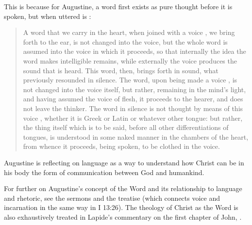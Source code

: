 This is because for Augustine, a word first exists as pure thought before it is
spoken, but when uttered is :
\begin{quote}
    A word  that we carry in the heart, when
    joined with a voice , we bring
    forth to the ear, is not changed into the voice, but the whole word is
    assumed into the voice in which it proceeds, so that internally the idea the
    word makes intelligible remains, while externally the voice produces the
    sound that is heard.
    This word, then, brings forth in sound, what previously resounded in
    silence.  The word, upon being made a voice , is
    not changed into the voice itself, but rather, remaining in the mind's
    light, and having assumed the voice  of flesh, it proceeds to
    the hearer, and does not leave the thinker.
    The word in silence is not thought by means of this voice ,
    whether it is Greek or Latin or whatever other tongue: but rather, the thing
    itself which is to be said, before all other differentiations of tongues, is
    understood in some naked manner in the chambers of the heart, from whence it
    proceeds, being spoken, to be clothed in the voice.%
    \Autocite
    [1002, Sermo 187, In Natali Domini 4: .] 
    {Augustine:SermonesPL}
\end{quote}
Augustine is reflecting on language as a way to understand how Christ can be in
his body the form of communication between God and
humankind.%
\begin{Footnote}
    For further on Augustine's concept of the Word and its relationship to
    language and rhetoric, see the sermons  and the
    treatise  (which connects voice and
    incarnation in the same way in I 13:26).
    The theology of Christ as the Word is also exhaustively treated in Lapide's
    commentary on the first chapter of John,
    \autocite[872--889]{Lapide:Gospels19C}.
\end{Footnote}

